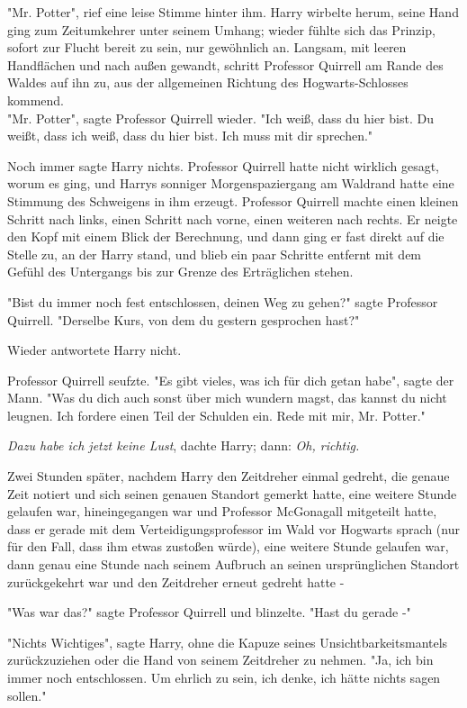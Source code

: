 {"Mr. Potter", rief eine leise Stimme hinter ihm. Harry wirbelte herum, seine Hand ging zum Zeitumkehrer unter seinem Umhang; wieder fühlte sich das Prinzip, sofort zur Flucht bereit zu sein, nur gewöhnlich an. Langsam, mit leeren Handflächen und nach außen gewandt, schritt Professor Quirrell am Rande des Waldes auf ihn zu, aus der allgemeinen Richtung des Hogwarts-Schlosses kommend.\\ "Mr. Potter", sagte Professor Quirrell wieder. "Ich weiß, dass du hier bist. Du weißt, dass ich weiß, dass du hier bist. Ich muss mit dir sprechen."

Noch immer sagte Harry nichts. Professor Quirrell hatte nicht wirklich gesagt, worum es ging, und Harrys sonniger Morgenspaziergang am Waldrand hatte eine Stimmung des Schweigens in ihm erzeugt. Professor Quirrell machte einen kleinen Schritt nach links, einen Schritt nach vorne, einen weiteren nach rechts. Er neigte den Kopf mit einem Blick der Berechnung, und dann ging er fast direkt auf die Stelle zu, an der Harry stand, und blieb ein paar Schritte entfernt mit dem Gefühl des Untergangs bis zur Grenze des Erträglichen stehen.

"Bist du immer noch fest entschlossen, deinen Weg zu gehen?" sagte Professor Quirrell. "Derselbe Kurs, von dem du gestern gesprochen hast?"

Wieder antwortete Harry nicht.

Professor Quirrell seufzte. "Es gibt vieles, was ich für dich getan habe", sagte der Mann. "Was du dich auch sonst über mich wundern magst, das kannst du nicht leugnen. Ich fordere einen Teil der Schulden ein. Rede mit mir, Mr. Potter."

\emph{Dazu habe ich jetzt keine Lust}, dachte Harry; dann: \emph{Oh, richtig.}

Zwei Stunden später, nachdem Harry den Zeitdreher einmal gedreht, die genaue Zeit notiert und sich seinen genauen Standort gemerkt hatte, eine weitere Stunde gelaufen war, hineingegangen war und Professor McGonagall mitgeteilt hatte, dass er gerade mit dem Verteidigungsprofessor im Wald vor Hogwarts sprach (nur für den Fall, dass ihm etwas zustoßen würde), eine weitere Stunde gelaufen war, dann genau eine Stunde nach seinem Aufbruch an seinen ursprünglichen Standort zurückgekehrt war und den Zeitdreher erneut gedreht hatte -

"Was war das?" sagte Professor Quirrell und blinzelte. "Hast du gerade -"

"Nichts Wichtiges", sagte Harry, ohne die Kapuze seines Unsichtbarkeitsmantels zurückzuziehen oder die Hand von seinem Zeitdreher zu nehmen. "Ja, ich bin immer noch entschlossen. Um ehrlich zu sein, ich denke, ich hätte nichts sagen sollen."

}
